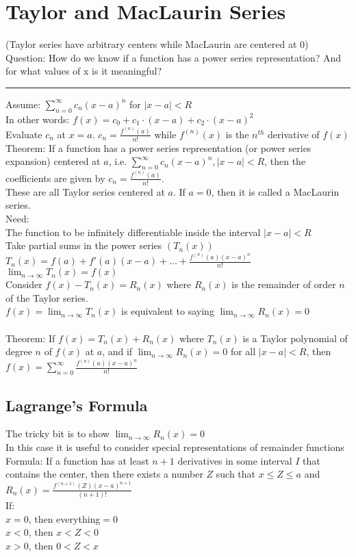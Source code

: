 \documentclass{article}
\begin{document}
\section{Taylor and MacLaurin Series}
(Taylor series have arbitrary centers while MacLaurin are centered at 0)\\
Question: How do we know if a function has a power series representation? And for what values of x is it meaningful?\\
\hrule
Assume: $\displaystyle \sum^\infty_{n=0}c_n(x-a)^n$ for $|x-a|<R$\\
In other words: $f(x)=c_0+c_1 \cdot (x-a) + c_2 \cdot (x-a)^2$\\
Evaluate $c_n$ at $x=a$. $c_n=\frac{f^{(n)}(a)}{n!}$ while $f^{(n)}(x)$ is the $n^{th}$ derivative of $f(x)$\\
Theorem: If a function has a power series representation (or power series expansion) centered at $a$, i.e. $\displaystyle \sum^\infty_{n=0}c_n(x-a)^n, |x-a|<R$, then the coefficients are given by $c_n=\frac{f^{(n)}(a)}{n!}$.\\
These are all Taylor series centered at $a$. If $a=0$, then it is called a MacLaurin series.\\
Need:\\
\indent The function to be infinitely differentiable inside the interval $|x-a|<R$\\
\indent Take partial sums in the power series $(T_n(x))$\\
\indent \indent $T_n(x)=f(a)+f'(a)(x-a)+...+\frac{f^{(n)}(a)(x-a)^n}{n!}$\\
\indent $\displaystyle \lim_{n\to\infty}T_n(x)=f(x)$\\
Consider $f(x)-T_n(x)=R_n(x)$ where $R_n(x)$ is the remainder of order $n$ of the Taylor series.\\
$\displaystyle f(x)=\lim_{n\to\infty}T_n(x)$ is equivalent to saying $\displaystyle \lim_{n\to\infty}R_n(x)=0$\\\\
Theorem: If $f(x)=T_n(x)+R_n(x)$ where $T_n(x)$ is a Taylor polynomial of degree $n$ of $f(x)$ at $a$, and if $\displaystyle \lim_{n\to\infty}R_n(x)=0$ for all $|x-a|<R$, then $\displaystyle f(x)=\sum^\infty_{n=0}\frac{f^{(n)}(a)(x-a)^n}{n!}$
\subsection*{Lagrange's Formula}
The tricky bit is to show $\displaystyle \lim_{n\to\infty}R_n(x)=0$\\
In this case it is useful to consider special representations of remainder functions\\
Formula: If a function has at least $n+1$ derivatives in some interval $I$ that contains the center, then there exists a number $Z$ such that $x\le Z\le a$ and $R_n(x)=\frac{f^{(n+1)}(Z)(x-a)^{n+1}}{(n+1)!}$\\
If:\\
\indent $x=0$, then everything$=0$\\
\indent $x<0$, then $x<Z<0$\\
\indent $x>0$, then $0<Z<x$\\
\end{document}
